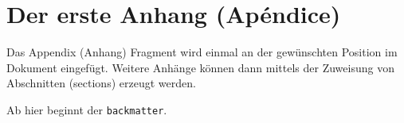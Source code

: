 \chapter{Der erste Anhang (Ap\'endice)}

Das Appendix (Anhang) Fragment wird einmal an der gew\"{u}nschten Position
im Dokument eingef\"{u}gt. Weitere Anh\"{a}nge k\"{o}nnen dann mittels der
Zuweisung von Abschnitten (sections) erzeugt werden.

\bigskip

Ab hier beginnt der \verb|backmatter|.
